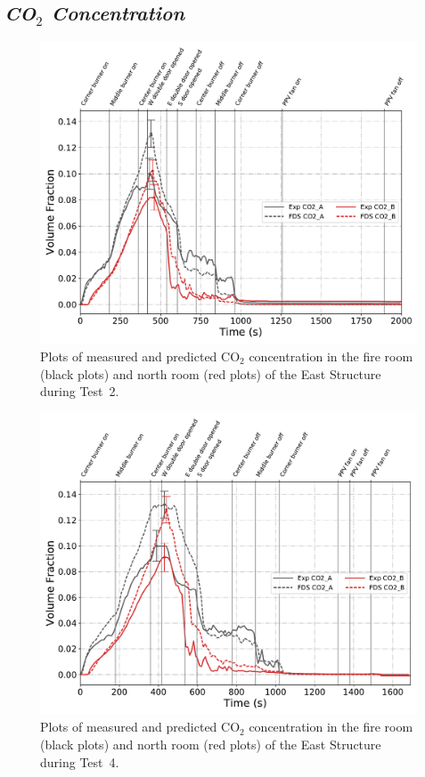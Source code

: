\clearpage
\subsection*{\textit{CO$_2$ Concentration}}
\begin{figure}[!h]
	\centering
	\includegraphics[width=\columnwidth]{Figures/Plots/Validation/Gas_Concentration/Test_2_CO2}
	\caption[Plots of measured and predicted CO$_2$ concentration during Test~2.]{Plots of measured and predicted CO$_2$ concentration in the fire room (black plots) and north room (red plots) of the East Structure during Test~2.}
	\label{fig:Test2_CO2}
\end{figure}

\begin{figure}[!h]
	\centering
	\includegraphics[width=\columnwidth]{Figures/Plots/Validation/Gas_Concentration/Test_4_CO2}
	\caption[Plots of measured and predicted CO$_2$ concentration during Test~4.]{Plots of measured and predicted CO$_2$ concentration in the fire room (black plots) and north room (red plots) of the East Structure during Test~4.}
	\label{fig:Test4_CO2}
\end{figure}

